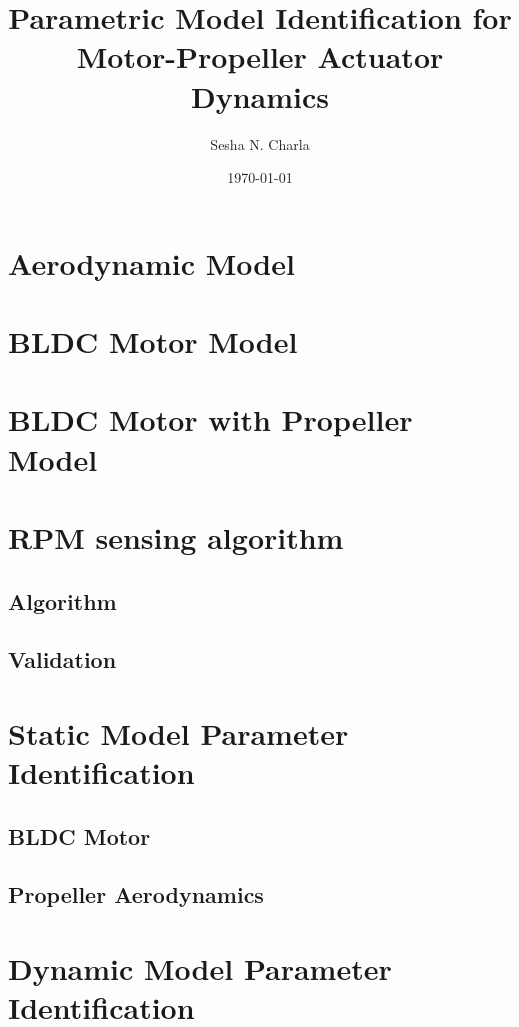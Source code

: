 \documentclass[letterpaper, 11pt]{article}
\title{Parametric Model Identification for Motor-Propeller Actuator Dynamics}
\author{Sesha N. Charla}
\date{\today}
\begin{document}
\maketitle
\tableofcontents

\newpage
\section{Aerodynamic Model}

\section{BLDC Motor Model}



\section{BLDC Motor with Propeller Model}

\newpage
\section{RPM sensing algorithm}
\subsection{Algorithm}
\subsection{Validation}
\section{Static Model Parameter Identification}
\subsection{BLDC Motor}
\subsection{Propeller Aerodynamics}
\section{Dynamic Model Parameter Identification}
\end{document}
